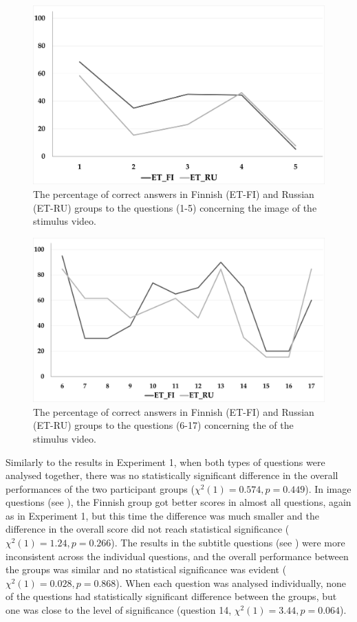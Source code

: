 \documentclass[output=paper]{langsci/langscibook}
\begin{document}
\begin{figure}[h]
 \includegraphics[width=\textwidth]{figures/Lang3.png}
 \caption{The percentage of correct answers in Finnish (ET-FI) and Russian (ET-RU) groups to the questions (1-5) concerning the image of the stimulus video.}
 \label{lang:fig:3}
\end{figure} 

\begin{figure}[h]
 \includegraphics[width=\textwidth]{figures/Lang4.png}
 \caption{The percentage of correct answers in Finnish (ET-FI) and Russian (ET-RU) groups to the questions (6-17) concerning the  of the stimulus video.}
 \label{lang:fig:4}
\end{figure} 

Similarly to the results in Experiment 1, when both types of questions were analysed together, there was no statistically significant difference in the overall performances of the two participant groups (${\chi}^2(1) = 0.574, p = 0.449$). In image questions (see ), the Finnish group got better scores in almost all questions, again as in Experiment 1, but this time the difference was much smaller and the difference in the overall score did not reach statistical significance (${\chi}^2(1) = 1.24, p = 0.266$). The results in the subtitle questions (see ) were more inconsistent across the individual questions, and the overall performance between the groups was similar and no statistical significance was evident (${\chi}^2(1) = 0.028, p = 0.868$). When each question was analysed individually, none of the questions had statistically significant difference  between the groups, but one was close to the level of significance (question 14, ${\chi}^2(1) = 3.44, p = 0.064$).
 
\end{document}
